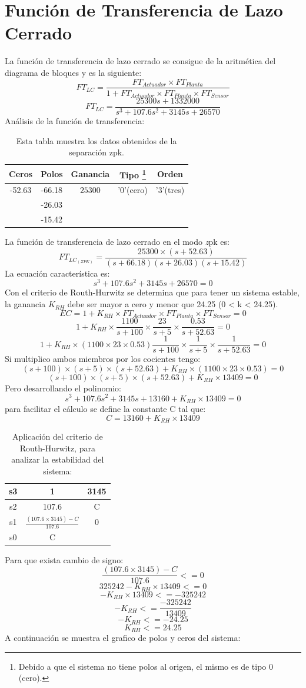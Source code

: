 \documentclass[a4paper,11pt]{article}
\begin{document}
\section{Función de Transferencia de Lazo Cerrado}
La función de transferencia de lazo cerrado se consigue de la aritmética del diagrama de bloques y es la siguiente:
$$FT_{LC}=\frac{FT_{Actuador} \times FT_{Planta} }{1+FT_{Actuador}  \times FT_{Planta} \times FT_{Sensor}} $$
$$FT_{LC}=\frac{25300s+1332000}{s^3 + 107.6 s^2 + 3145 s + 26570}$$
Análisis de la función de transferencia:
\begin{table}[h!]
\centering
\caption{Esta tabla muestra los datos obtenidos de la separación zpk.}
\begin{tabular}{|ccccc|}
\hline 
 Ceros & Polos & Ganancia & Tipo \footnote{Debido a que el sistema no tiene polos al origen, el mismo es de tipo 0 (cero).} & Orden \tabularnewline
\hline 
\hline 
 -52.63 & -66.18 & $25300$ & '0'(cero) & '3'(tres) \tabularnewline
 & -26.03 & & &\tabularnewline
 & -15.42 & & &\tabularnewline
\hline 
\end{tabular}
\end{table}
La función de transferencia de lazo cerrado en el modo \emph zpk es:
$$FT_{LC_{(ZPK)}}=\frac{25300\times(s+52.63)}{(s + 66.18)(s + 26.03)(s + 15.42)}$$
La ecuación característica es:  
$$s^3 + 107.6 s^2 + 3145 s + 26570=0$$
Con el criterio de Routh-Hurwitz se determina que para tener un sistema estable, la ganancia $K_{RH}$ debe ser mayor a cero y menor que 24.25 (0 < k < 24.25).\\
$$EC=1+K_{RH}\times FT_{Actuador}\times FT_{Planta}\times FT_{Sensor}=0$$
$$1+K_{RH}\times \frac{1100}{s + 100}\times \frac{23}{s + 5}\times \frac{0.53}{s + 52.63}=0$$
$$1+K_{RH}\times (1100\times23\times0.53)\frac{1}{s + 100}\times \frac{1}{s + 5}\times \frac{1}{s + 52.63}=0$$
Si multiplico ambos miembros por los cocientes tengo:
$$(s + 100)\times (s + 5)\times (s + 52.63)+K_{RH}\times (1100\times23\times0.53)=0$$
$$(s + 100)\times (s + 5)\times (s + 52.63)+K_{RH}\times13409=0$$
Pero desarrollando el polinomio:
$$s^3 + 107.6 s^2+ 3145 s + 13160 + K_{RH}\times13409=0$$
para facilitar el cálculo se define la constante C tal que:
$$C = 13160 + K_{RH}\times13409 $$
\begin{table}[h!]
\centering
\caption{Aplicación del criterio de Routh-Hurwitz, para analizar la estabilidad del sistema:}
\begin{tabular}{|c|c|c|}
\hline 
s3 & 1 & 3145\tabularnewline
\hline 
s2 & 107.6 & C\tabularnewline
\hline 
s1 & $\frac{(107.6\times3145)-C}{107.6}$ & 0\tabularnewline
\hline 
s0 & C & \tabularnewline
\hline 
\end{tabular}
\end{table}
Para que exista cambio de signo:
$$\frac{(107.6\times3145)-C}{107.6}<=0$$
$$325242 - K_{RH}\times13409<=0$$
$$- K_{RH}\times13409<=-325242 $$
$$- K_{RH}<=\frac{-325242}{13409} $$
$$ - K_{RH}<=-24.25 $$
$$ K_{RH}<=24.25 $$
A continuación se muestra el grafico de polos y ceros del sistema:\\
\end{document}
